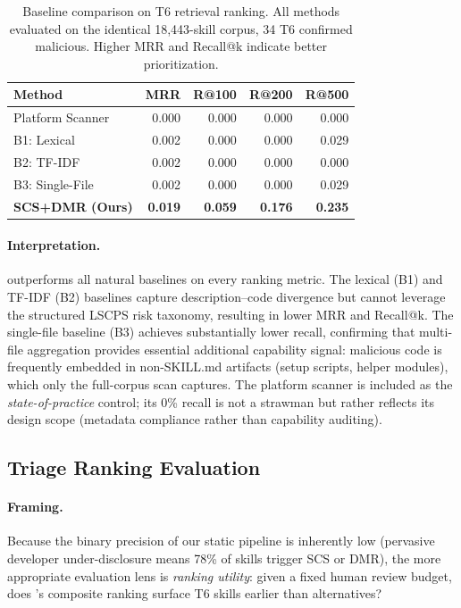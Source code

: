 \begin{table}[h]
\centering
\caption{Baseline comparison on T6 retrieval ranking.
  All methods evaluated on the identical 18,443-skill corpus,
  34 T6 confirmed malicious.
  Higher MRR and Recall@k indicate better prioritization.}
\label{tab:baselines}
\small
\begin{tabular}{@{}lrrrr@{}}
\toprule
\textbf{Method} & \textbf{MRR} & \textbf{R@100} & \textbf{R@200} & \textbf{R@500} \\
\midrule
Platform Scanner & 0.000 & 0.000 & 0.000 & 0.000 \\
B1: Lexical      & 0.002 & 0.000 & 0.000 & 0.029 \\
B2: TF-IDF       & 0.002 & 0.000 & 0.000 & 0.000 \\
B3: Single-File  & 0.002 & 0.000 & 0.000 & 0.029 \\
\textbf{SCS+DMR (Ours)} & \textbf{0.019} & \textbf{0.059} & \textbf{0.176} & \textbf{0.235} \\
\bottomrule
\end{tabular}
\end{table}

\paragraph{Interpretation.}
\sysname outperforms all natural baselines on every ranking metric.
The lexical (B1) and TF-IDF (B2) baselines capture description--code
divergence but cannot leverage the structured LSCPS risk taxonomy,
resulting in lower MRR and Recall@k.
The single-file baseline (B3) achieves substantially lower recall,
confirming that multi-file aggregation provides essential additional
capability signal: malicious code is frequently embedded in non-SKILL.md artifacts
(setup scripts, helper modules), which only the full-corpus scan captures.
The platform scanner is included as the \emph{state-of-practice} control;
its 0\% recall is not a strawman but rather reflects its design scope
(metadata compliance rather than capability auditing).

\subsection{Triage Ranking Evaluation}
\label{sec:triage}

\paragraph{Framing.}
Because the binary precision of our static pipeline is inherently low
(pervasive developer under-disclosure means 78\% of skills trigger SCS or DMR),
the more appropriate evaluation lens is \emph{ranking utility}: given a fixed
human review budget, does \sysname's composite ranking surface T6 skills
earlier than alternatives?

